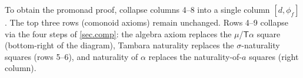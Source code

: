 \documentclass[11pt]{article}
\theoremstyle{definition}
\newcommand{\Fun}[1]{\textsf{#1}}
\newcommand{\ihom}[2]{[#1,#2]}
\begin{document}
\noindent To obtain the promonad proof, collapse columns 4--8 into a single column $\ihom{d}{\phi_f}$. The top three rows (comonoid axioms) remain unchanged. Rows 4--9 collapse via the four steps of \cref{sec.comp}: the algebra axiom replaces the $\mu$/$\Fun{T}\alpha$ square (bottom-right of the diagram), Tambara naturality replaces the $\sigma$-naturality squares (rows 5--6), and naturality of $\alpha$ replaces the naturality-of-$a$ squares (right column).
\end{document}

